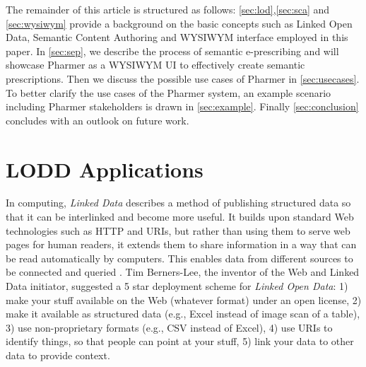 \documentclass[journal]{IEEEtran}
\begin{document}
The remainder of this article is structured as follows:
\autoref{sec:lod},\autoref{sec:sca} and \autoref{sec:wysiwym} provide a background on the basic concepts such as Linked Open Data, Semantic Content Authoring and WYSIWYM interface employed in this paper.
In \autoref{sec:sep}, we describe the process of semantic e-prescribing and will showcase Pharmer as a WYSIWYM UI to effectively create semantic prescriptions.
Then we discuss the possible use cases of Pharmer in \autoref{sec:usecases}.
To better clarify the use cases of the Pharmer system, an example scenario including Pharmer stakeholders is drawn in \autoref{sec:example}.
Finally \autoref{sec:conclusion} concludes with an outlook on future work.

\section{LODD Applications}
\label{sec:lod}

In computing, \emph{Linked Data} describes a method of publishing structured data so that it can be interlinked and become more useful.
It builds upon standard Web technologies such as HTTP and URIs, but rather than using them to serve web pages for human readers, it extends them to share information in a way that can be read automatically by computers.
This enables data from different sources to be connected and queried \cite{linkeddata}.
Tim Berners-Lee, the inventor of the Web and Linked Data initiator, suggested a 5 star deployment scheme for \emph{Linked Open Data}:
1) make your stuff available on the Web (whatever format) under an open license,
2) make it available as structured data (e.g., Excel instead of image scan of a table),
3) use non-proprietary formats (e.g., CSV instead of Excel),
4) use URIs to identify things, so that people can point at your stuff,
5) link your data to other data to provide context.
\end{document}
